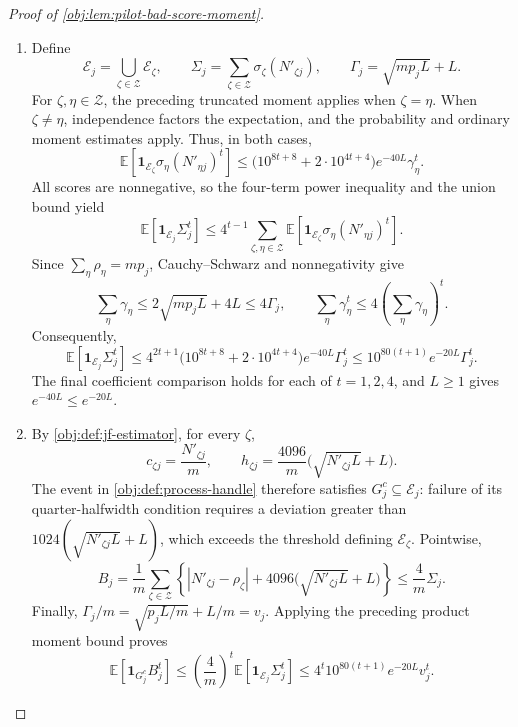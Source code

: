 \documentclass[11pt]{article}
\begin{document}
\begin{proof}[Proof of \cref{obj:lem:pilot-bad-score-moment}]
\begin{enumerate}
For \(t\in\{1,2,4\}\), the elementary square inequality gives
\[
\mathbf1_{\mathscr E_\zeta}\sigma_\zeta(N'_{\zeta j})^t
\leq\frac12\left[
e^{-40L}\gamma_\zeta^{-t}\sigma_\zeta(N'_{\zeta j})^{2t}
+e^{40L}\gamma_\zeta^t\mathbf1_{\mathscr E_\zeta}
\right].
\]
Taking expectations and using the two estimates above gives
\[
\mathbb E\!\left[
\mathbf1_{\mathscr E_\zeta}\sigma_\zeta(N'_{\zeta j})^t
\right]
\leq
\frac{10^{8t+4}+2}{2}e^{-40L}\gamma_\zeta^t
\leq10^{8t+8}e^{-40L}\gamma_\zeta^t.
\]

\item Define
\[
\mathscr E_j=\bigcup_{\zeta\in\mathcal Z}\mathscr E_\zeta,\qquad
\Sigma_j=\sum_{\zeta\in\mathcal Z}\sigma_\zeta(N'_{\zeta j}),
\qquad
\Gamma_j=\sqrt{mp_jL}+L.
\]
For \(\zeta,\eta\in\mathcal Z\), the preceding truncated moment applies when
\(\zeta=\eta\). When \(\zeta\ne\eta\), independence factors the expectation, and the probability and ordinary moment estimates apply. Thus, in both cases,
\[
\mathbb E\!\left[
\mathbf1_{\mathscr E_\zeta}
\sigma_\eta(N'_{\eta j})^t
\right]
\leq
\bigl(10^{8t+8}+2\cdot10^{4t+4}\bigr)
e^{-40L}\gamma_\eta^t.
\]
All scores are nonnegative, so the four-term power inequality and the union bound yield
\[
\mathbb E[\mathbf1_{\mathscr E_j}\Sigma_j^t]
\leq
4^{t-1}\sum_{\zeta,\eta\in\mathcal Z}
\mathbb E\!\left[
\mathbf1_{\mathscr E_\zeta}
\sigma_\eta(N'_{\eta j})^t
\right].
\]
Since \(\sum_\eta\rho_\eta=mp_j\), Cauchy–Schwarz and nonnegativity give
\[
\sum_\eta\gamma_\eta
\leq2\sqrt{mp_jL}+4L\leq4\Gamma_j,
\qquad
\sum_\eta\gamma_\eta^t
\leq4\left(\sum_\eta\gamma_\eta\right)^t.
\]
Consequently,
\[
\mathbb E[\mathbf1_{\mathscr E_j}\Sigma_j^t]
\leq
4^{2t+1}
\bigl(10^{8t+8}+2\cdot10^{4t+4}\bigr)
e^{-40L}\Gamma_j^t
\leq10^{80(t+1)}e^{-20L}\Gamma_j^t.
\]
The final coefficient comparison holds for each of \(t=1,2,4\), and \(L\geq1\) gives \(e^{-40L}\leq e^{-20L}\).

\item By \cref{obj:def:jf-estimator}, for every \(\zeta\),
\[
c_{\zeta j}=\frac{N'_{\zeta j}}m,\qquad
h_{\zeta j}=\frac{4096}{m}
\bigl(\sqrt{N'_{\zeta j}L}+L\bigr).
\]
The event in \cref{obj:def:process-handle} therefore satisfies
\(G_j^c\subseteq\mathscr E_j\): failure of its quarter-halfwidth condition requires a deviation greater than \(1024(\sqrt{N'_{\zeta j}L}+L)\), which exceeds the threshold defining \(\mathscr E_\zeta\). Pointwise,
\[
B_j
=\frac1m\sum_{\zeta\in\mathcal Z}
\left\{|N'_{\zeta j}-\rho_\zeta|
+4096\bigl(\sqrt{N'_{\zeta j}L}+L\bigr)\right\}
\leq\frac4m\Sigma_j.
\]
Finally, \(\Gamma_j/m=\sqrt{p_jL/m}+L/m=v_j\). Applying the preceding product moment bound proves
\[
\mathbb E[\mathbf1_{G_j^c}B_j^t]
\leq\left(\frac4m\right)^t
\mathbb E[\mathbf1_{\mathscr E_j}\Sigma_j^t]
\leq4^t10^{80(t+1)}e^{-20L}v_j^t.
\]
\end{enumerate}
\end{proof}
\end{document}

